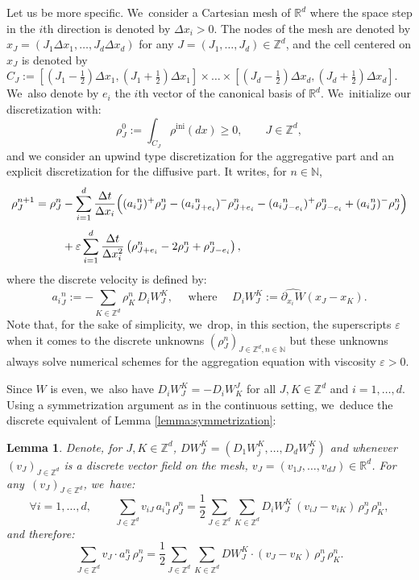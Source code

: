 \documentclass[11pt]{article}
\numberwithin{equation}{section}
\newcommand{\ini}{\mathrm{ini}}
\def\NN{\mathbb{N}}
\def\RR{\mathbb{R}}
\def\ZZ{\mathbb{Z}}
\def\eps{\varepsilon}
\def\pa{\partial}
\def\dt{\Delta t}
\def\dx{\Delta x}
\theoremstyle{plain}
\newtheorem{lemma}[theorem]{Lemma}
\theoremstyle{definition}
\begin{document}
Let us be more specific. We~consider a Cartesian mesh of $\RR^d$ where the space step in the $i$th direction is denoted by $\dx_i>0$. The nodes of the mesh are denoted by $x_J = (J_1 \dx_1, \ldots, J_d \dx_d)$ for any $J=(J_1, \ldots, J_d)\in \ZZ^d$, and the cell centered on $x_J$ is denoted by $C_J:=[(J_1-\frac 12)\dx_1,(J_1+\frac 12)\dx_1]\times \ldots \times [(J_d-\frac 12)\dx_d,(J_d+\frac 12)\dx_d]$. We~also denote by $e_i$ the $i$th vector of the canonical basis of $\RR^d$. We~initialize our discretization with:
\begin{equation}\label{dis:rho0}
\rho_{J}^0:= \int_{C_J} \rho^{\ini}(dx)\geq 0, \qquad J \in \ZZ^d,
\end{equation}
and we consider an upwind type discretization for the aggregative part \cite{dlv17, lv17, dlv20} and an explicit discretization for the diffusive part. It writes, for $n \in \NN$,
\begin{align}
\rho_{J}^{n+1} = \rho_{J}^n &- \sum_{i=1}^{d} \frac{\dt}{\dx_i}
\Big(({a_i}^n_{J})^+ \rho_{J}^n - ({a_i}^n_{J+e_i})^- \rho_{J+e_i}^n
-({a_i}^n_{J-e_i})^+ \rho_{J-e_i}^n + ({a_i}^n_{J})^- \rho_{J}^n \Big)\notag \\[-5pt]\label{dis:explicit}
\\[-8pt]
& + \eps \sum_{i=1}^{d} \frac{\dt}{\dx_i^2} \left(\rho_{J+e_i}^n - 2\rho_J^n + \rho_{J-e_i}^n \right),\notag
\end{align}
where the discrete velocity is defined by:
\begin{equation}
\label{def:aij}
{a_i}^n_{J} := -\sum_{K\in \ZZ^d} \rho_{K}^n \,D_iW_J^K,
\quad \mbox{ where } \quad
D_iW_J^K := \widehat{\pa_{x_i} W}(x_J-x_K).
\end{equation}
Note that, for the sake of simplicity, we~drop, in this section, the superscripts $\eps$ when it comes to the discrete unknowns $(\rho_J^n)_{J\in \ZZ^d, n \in \mathbb N}$ but these unknowns always solve numerical schemes for the aggregation equation with viscosity $\eps>0$.

Since $W$ is even, we~also have $D_iW_{J}^{K} = -D_iW^{J}_{K}$ for all $J, K \in \ZZ^d$ and $i =1,\ldots,d$. Using a symmetrization argument as in the continuous setting, we~deduce the discrete equivalent of Lemma \ref{lemma:symmetrization}:
\begin{lemma}\label{lemma:symmetrizationDis}
Denote, for $J, K \in \ZZ^d$, $DW_J^K = (D_1W_j^K, \ldots, D_dW_J^K)$ and whenever $(v_J)_{J \in \ZZ^d}$ is a discrete vector field on the mesh, $v_J = (v_{1J}, \ldots, v_{dJ}) \in \RR^d$. For any~$(v_J)_{J \in \ZZ^d}$, we~have:
\[
\forall i=1, \ldots, d, \qquad \sum_{J\in \ZZ^d} v_{iJ} \, {a_i}^n_{J} \, \rho_{J}^n = \frac 12 \sum_{J\in \ZZ^d} \sum_{K\in \ZZ^d} D_iW_J^K \, (v_{iJ} - v_{iK}) \, \rho_{J}^n \, \rho_{K}^n,
\]
and therefore:
\[
\sum_{J\in \ZZ^d} v_{J} \cdot {a}^n_{J} \, \rho_{J}^n = \frac 12 \sum_{J\in \ZZ^d} \sum_{K\in \ZZ^d} DW_J^K \cdot (v_{J} - v_{K}) \, \rho_{J}^n \, \rho_{K}^n.
\]
\end{lemma}
\end{document}
